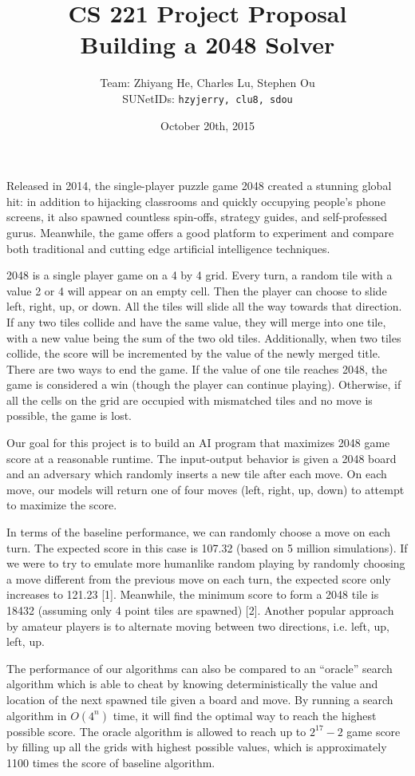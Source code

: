 \documentclass[11pt]{article}
\title{CS 221 Project Proposal \\ Building a 2048 Solver}
\author{Team: Zhiyang He, Charles Lu, Stephen Ou \\ SUNetIDs: \texttt{hzyjerry, clu8, sdou}}
\date{October 20th, 2015}
\begin{document}
\maketitle

Released in 2014, the single-player puzzle game 2048 created a stunning global hit: in addition to hijacking classrooms and quickly occupying people’s phone screens, it also spawned countless spin-offs, strategy guides, and self-professed gurus. Meanwhile, the game offers a good platform to experiment and compare both traditional and cutting edge artificial intelligence techniques.

2048 is a single player game on a 4 by 4 grid. Every turn, a random tile with a value 2 or 4 will appear on an empty cell. Then the player can choose to slide left, right, up, or down. All the tiles will slide all the way towards that direction. If any two tiles collide and have the same value, they will merge into one tile, with a new value being the sum of the two old tiles. Additionally, when two tiles collide, the score will be incremented by the value of the newly merged title. There are two ways to end the game. If the value of one tile reaches 2048, the game is considered a win (though the player can continue playing). Otherwise, if all the cells on the grid are occupied with mismatched tiles and no move is possible, the game is lost.

Our goal for this project is to build an AI program that maximizes 2048 game score at a reasonable runtime. The input-output behavior is given a 2048 board and an adversary which randomly inserts a new tile after each move. On each move, our models will return one of four moves (left, right, up, down) to attempt to maximize the score.

In terms of the baseline performance, we can randomly choose a move on each turn. The expected score in this case is 107.32 (based on 5 million simulations). If we were to try to emulate more humanlike random playing by randomly choosing a move different from the previous move on each turn, the expected score only increases to 121.23 [1]. Meanwhile, the minimum score to form a 2048 tile is 18432 (assuming only 4 point tiles are spawned) [2]. Another popular approach by amateur players is to alternate moving between two directions, i.e. left, up, left, up. 

The performance of our algorithms can also be compared to an “oracle” search algorithm which is able to cheat by knowing deterministically the value and location of the next spawned tile given a board and move. By running a search algorithm in $O(4^n)$ time, it will find the optimal way to reach the highest possible score. The oracle algorithm is allowed to reach up to $2^{17} - 2$ game score by filling up all the grids with highest possible values, which is approximately 1100 times the score of baseline algorithm.
\end{document}
